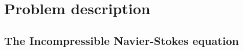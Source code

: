 
\chapter{Problem description} %

\label{physics} %


\section{The Incompressible Navier-Stokes equation}


